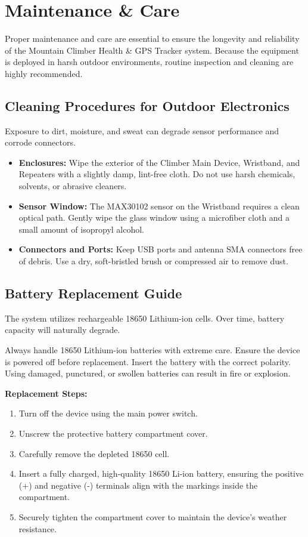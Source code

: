\chapter{Maintenance \& Care}
\label{ch:maintenance}

Proper maintenance and care are essential to ensure the longevity and reliability of the Mountain Climber Health \& GPS Tracker system. Because the equipment is deployed in harsh outdoor environments, routine inspection and cleaning are highly recommended.

\section{Cleaning Procedures for Outdoor Electronics}
\label{sec:cleaning-procedures}

Exposure to dirt, moisture, and sweat can degrade sensor performance and corrode connectors.
\begin{itemize}
    \item \textbf{Enclosures:} Wipe the exterior of the Climber Main Device, Wristband, and Repeaters with a slightly damp, lint-free cloth. Do not use harsh chemicals, solvents, or abrasive cleaners.
    \item \textbf{Sensor Window:} The MAX30102 sensor on the Wristband requires a clean optical path. Gently wipe the glass window using a microfiber cloth and a small amount of isopropyl alcohol.
    \item \textbf{Connectors and Ports:} Keep USB ports and antenna SMA connectors free of debris. Use a dry, soft-bristled brush or compressed air to remove dust.
\end{itemize}

\section{Battery Replacement Guide}
\label{sec:battery-replacement}

The system utilizes rechargeable 18650 Lithium-ion cells. Over time, battery capacity will naturally degrade.

\begin{warningbox}
Always handle 18650 Lithium-ion batteries with extreme care. Ensure the device is powered off before replacement. Insert the battery with the correct polarity. Using damaged, punctured, or swollen batteries can result in fire or explosion.
\end{warningbox}

\textbf{Replacement Steps:}
\begin{enumerate}
    \item Turn off the device using the main power switch.
    \item Unscrew the protective battery compartment cover.
    \item Carefully remove the depleted 18650 cell.
    \item Insert a fully charged, high-quality 18650 Li-ion battery, ensuring the positive (+) and negative (-) terminals align with the markings inside the compartment.
    \item Securely tighten the compartment cover to maintain the device's weather resistance.
\end{enumerate}

